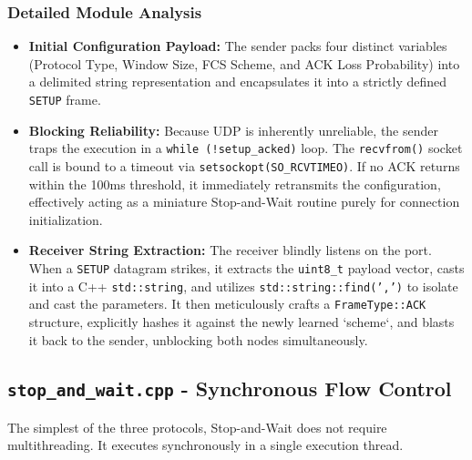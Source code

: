 \documentclass[12pt, a4paper]{article}
\begin{document}
\subsubsection{Detailed Module Analysis}
\begin{itemize}
    \item \textbf{Initial Configuration Payload:} The sender packs four distinct variables (Protocol Type, Window Size, FCS Scheme, and ACK Loss Probability) into a delimited string representation and encapsulates it into a strictly defined \texttt{SETUP} frame.
    \item \textbf{Blocking Reliability:} Because UDP is inherently unreliable, the sender traps the execution in a \texttt{while (!setup\_acked)} loop. The \texttt{recvfrom()} socket call is bound to a timeout via \texttt{setsockopt(SO\_RCVTIMEO)}. If no ACK returns within the 100ms threshold, it immediately retransmits the configuration, effectively acting as a miniature Stop-and-Wait routine purely for connection initialization.
    \item \textbf{Receiver String Extraction:} The receiver blindly listens on the port. When a \texttt{SETUP} datagram strikes, it extracts the \texttt{uint8\_t} payload vector, casts it into a C++ \texttt{std::string}, and utilizes \texttt{std::string::find(',')} to isolate and cast the parameters. It then meticulously crafts a \texttt{FrameType::ACK} structure, explicitly hashes it against the newly learned `scheme`, and blasts it back to the sender, unblocking both nodes simultaneously.
\end{itemize}


\subsection{\texttt{stop\_and\_wait.cpp} - Synchronous Flow Control}
The simplest of the three protocols, Stop-and-Wait does not require multithreading. It executes synchronously in a single execution thread.
\end{document}
